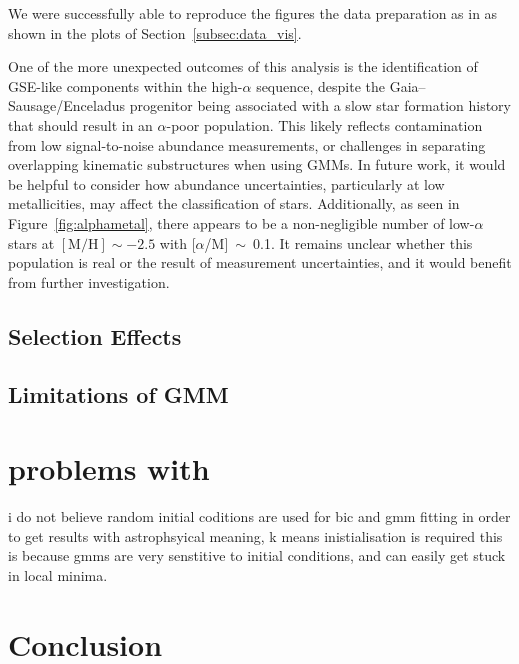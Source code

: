 \documentclass[a4paper,12pt]{article}
\begin{document}
We were successfully able to reproduce the figures the data preparation as in \citet{Vis2024} as shown in the plots of 
Section~\ref{subsec:data_vis}.

One of the more unexpected outcomes of this analysis is the identification of GSE-like components within the 
high-$\alpha$ sequence, despite the Gaia–Sausage/Enceladus progenitor being associated with a slow star formation 
history that should result in an $\alpha$-poor population. This likely reflects contamination from 
low signal-to-noise abundance measurements, or challenges in separating overlapping kinematic substructures 
when using GMMs. In future work, it would be helpful to consider how abundance uncertainties, particularly at low 
metallicities, may affect the classification of stars. Additionally, as seen in Figure~\ref{fig:alphametal}, 
there appears to be a non-negligible number of low-$\alpha$ stars at $[\mathrm{M/H}]\sim-2.5$ with 
[$\alpha$/M]~$\sim$~0.1. It remains unclear whether this population is real or the result of measurement 
uncertainties, and it would benefit from further investigation.










\subsection{Selection Effects}

\subsection{Limitations of GMM}






\section{problems with \citet{zhang2024existencemetalpoordiscmilky}}

i do not believe random initial coditions are used for bic and gmm fitting
in order to get results with astrophsyical meaning, k means inistialisation is required
this is because gmms are very senstitive to initial conditions, and can easily get stuck in local minima.


\section{Conclusion}



\newpage


\end{document}
